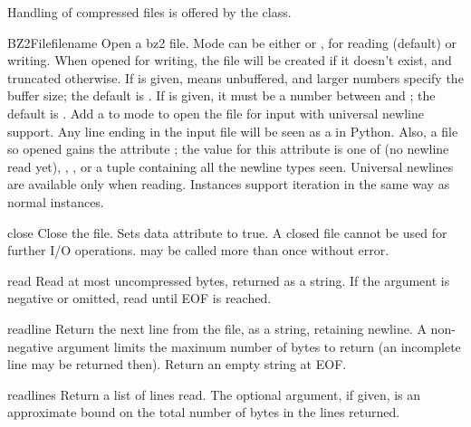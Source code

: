 Handling of compressed files is offered by the  class.

\begin{classdesc}{BZ2File}{filename}
Open a bz2 file. Mode can be either  or , for reading 
(default) or writing. When opened for writing, the file will be created if
it doesn't exist, and truncated otherwise. If  is given,
 means unbuffered, and larger numbers specify the buffer size;
the default is . If
 is given, it must be a number between  and
; the default is .
Add a  to mode to open the file for input with universal newline
support. Any line ending in the input file will be seen as a
 in Python.  Also, a file so opened gains the
attribute ; the value for this attribute is one of
 (no newline read yet), , ,
 or a tuple containing all the newline types
seen. Universal newlines are available only when reading.
Instances support iteration in the same way as normal 
instances.
\end{classdesc}

\begin{methoddesc}[BZ2File]{close}{}
Close the file. Sets data attribute  to true. A closed file
cannot be used for further I/O operations.  may be called
more than once without error.
\end{methoddesc}

\begin{methoddesc}[BZ2File]{read}{}
Read at most  uncompressed bytes, returned as a string. If the
 argument is negative or omitted, read until EOF is reached.
\end{methoddesc}

\begin{methoddesc}[BZ2File]{readline}{}
Return the next line from the file, as a string, retaining newline.
A non-negative  argument limits the maximum number of bytes to
return (an incomplete line may be returned then). Return an empty
string at EOF.
\end{methoddesc}

\begin{methoddesc}[BZ2File]{readlines}{}
Return a list of lines read. The optional  argument, if given,
is an approximate bound on the total number of bytes in the lines returned.
\end{methoddesc}

